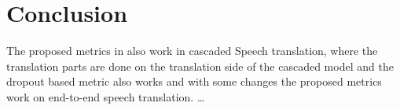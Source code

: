 
\chapter{Conclusion}
\label{ch:Conclusion}
The proposed metrics in \cite{fomicheva2020unsupervised} also work in cascaded Speech translation, where the translation parts are done on the translation side of the cascaded model and the dropout based metric also works and with some changes the proposed metrics work on end-to-end speech translation. 
\dots